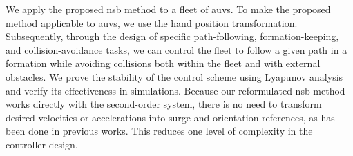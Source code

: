 We apply the proposed \gls{nsb} method to a fleet of \glspl{auv}.
To make the proposed method applicable to \glspl{auv}, we use the hand position transformation.
Subsequently, through the design of specific path-following, formation-keeping, and collision-avoidance tasks, we can control the fleet to follow a given path in a formation while avoiding collisions both within the fleet and with external obstacles. 
We prove the stability of the control scheme using Lyapunov analysis and verify its effectiveness in simulations. 
Because our reformulated \gls{nsb} method works directly with the second-order system, there is no need to transform desired velocities or accelerations into surge and orientation references, as has been done in previous works.
This reduces one level of complexity in the controller design.
